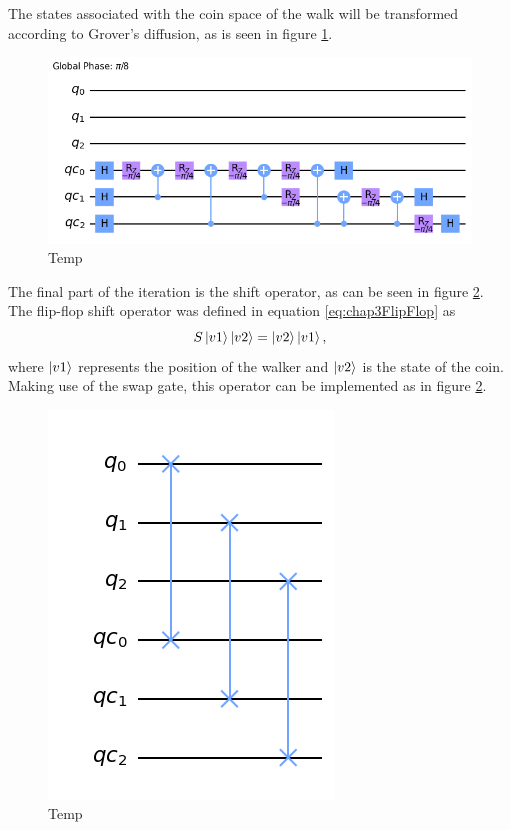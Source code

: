 \documentclass[../../dissertation.tex]{subfiles}
\begin{document}
The states associated with the coin space of the walk will be transformed according to Grover's diffusion, as is seen in figure \ref{fig:coinedQWSearchDiffCircuitQistkit}.
\begin{figure}[!h]
	\centering
	\includegraphics[scale=0.30]{img/Qiskit/CoinedQuantumWalk/Search/Circuits/CoinedSearchQiskitCircDiff_N3_M4_S5.png}
	\caption{Temp} 
	\label{fig:coinedQWSearchDiffCircuitQistkit}
\end{figure}
The final part of the iteration is the shift operator, as can be seen in figure \ref{fig:coinedQWSearchShiftCircuitQistkit}. The flip-flop shift operator was defined in equation \ref{eq:chap3FlipFlop} as 
\begin{equation}
        S\ket{v1}\ket{v2} = \ket{v2}\ket{v1},
        \label{eq:chap4FlipFlop}
\end{equation}
where $\ket{v1}$ represents the position of the walker and $\ket{v2}$ is the state of the coin. Making use of the swap gate, this operator can be implemented as in figure \ref{fig:coinedQWSearchShiftCircuitQistkit}.
\begin{figure}[!h]
	\centering
	\includegraphics[scale=0.27]{img/Qiskit/CoinedQuantumWalk/Search/Circuits/CoinedSearchQiskitCircShift_N3_M4_S5.png}
	\caption{Temp} 
	\label{fig:coinedQWSearchShiftCircuitQistkit}
\end{figure}\par
\end{document}

